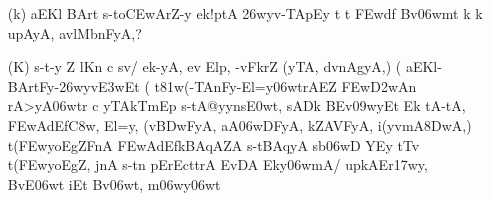 \begin{itemize}
\begin{itemize}
          \item[({\dn k})]  {\dn aEKl\? BArt\? s\2-to\3CEwArZ-y ek!ptA\2 \326wyv-TApEy\2 t\? t\? \3FEwd\?f\? Bv\306wmt\? k\? k\? upAyA, avlMbnFyA,{\rs ?\re}} 
          
          \item[({\dn K})] {\dn s\2-t-y Z\? l\?Kn\? c sv\0/ ek-yA, ev Elp\?, -vFkrZ\2 {\rs (\re}yTA{\rs ,\re} d\?vnAgyA\0,{\rs )\re} {\rs (\re}\dn\dnnum {}  aEKl{\rs -\re}BArtFy{\rs -\re}\326wyv\3E3wEt {\rs (\re}\dn\dnnum {} t\381w(-TAnFy{\rs -\re}El=y\306wtrAEZ \3FEw\3D2wAn\? rA>yA\306wtr\? c yTAkTmEp s\2-tA@yyns\3E0wt\?, sADk\2 BEv\309wyEt Ek tA-tA, \3FEwAd\?Ef\3C8w, El=y, {\rs (\re}v\3BDwFyA{\rs ,\re} aA\306wD\5FyA{\rs ,\re} kZA\0VFyA{\rs ,\re} i(y\?vmA\38DwA,{\rs )\re} t(\3FEwyoEgZFnA\2 \3FEwAd\?EfkBAqAZA\2 s\2-tBAqyA s\2b\306wD\2 YEy tT\4v t(\3FEwyoEgZ, jnA s\2-t\?n pErEcttrA EvDA Eky\306wmA/ upkAEr\317wy, BvE\306wt iEt Bv\306wt, m\306wy\306wt}
          \end{itemize}
\end{itemize}

